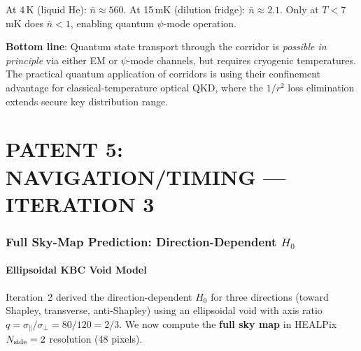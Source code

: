 \documentclass[aps,prd,twocolumn,superscriptaddress]{revtex4-2}
\begin{document}
At 4\,K (liquid He): $\bar{n} \approx 560$. At 15\,mK (dilution
fridge): $\bar{n} \approx 2.1$. Only at $T < 7$\,mK does
$\bar{n} < 1$, enabling quantum $\psi$-mode operation.

\textbf{Bottom line}: Quantum state transport through the
corridor is \emph{possible in principle} via either EM or $\psi$-mode
channels, but requires cryogenic temperatures. The practical
quantum application of corridors is using their confinement
advantage for classical-temperature optical QKD, where the
$1/r^2$ loss elimination extends secure key distribution range.


\part*{PATENT 5: NAVIGATION/TIMING --- ITERATION 3}


\section{Full Sky-Map Prediction: Direction-Dependent $H_0$}
\label{sec:sky-map}

\subsection{Ellipsoidal KBC Void Model}

Iteration~2 derived the direction-dependent $H_0$ for three
directions (toward Shapley, transverse, anti-Shapley) using
an ellipsoidal void with axis ratio $q = \sigma_\parallel/\sigma_\perp
= 80/120 = 2/3$. We now compute the \textbf{full sky map} in
HEALPix $N_{\rm side} = 2$ resolution (48 pixels).
\end{document}
